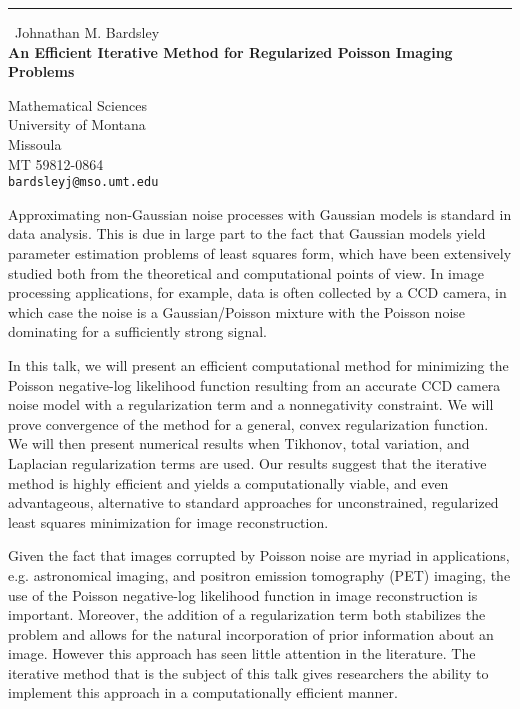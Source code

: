\documentclass{report}
\begin{document}
\begin{center}
\rule{6in}{1pt} \
{\large Johnathan M. Bardsley \\
{\bf An Efficient Iterative Method for Regularized Poisson Imaging Problems}}

Mathematical Sciences \\ University of Montana \\ Missoula \\ MT 59812-0864
\\
{\tt bardsleyj@mso.umt.edu}\end{center}

Approximating non-Gaussian noise processes with Gaussian models is
standard in data analysis. This is due in large part to the fact that
Gaussian models yield parameter estimation problems of least squares
form, which have been extensively studied both from the theoretical and
computational points of view. In image processing applications, for
example, data is often collected by a CCD camera, in which case the noise
is a Gaussian/Poisson mixture with the Poisson noise dominating for a
sufficiently strong signal.

In this talk, we will present an efficient computational method for
minimizing the Poisson negative-log likelihood function resulting from an
accurate CCD camera noise model with a regularization term and a
nonnegativity constraint. We will prove convergence of the method for a
general, convex regularization function. We will then present numerical
results when Tikhonov, total variation, and Laplacian regularization
terms are used. Our results suggest that the iterative method is highly
efficient and yields a computationally viable, and even advantageous,
alternative to standard approaches for unconstrained, regularized least
squares minimization for image reconstruction.

Given the fact that images corrupted by Poisson noise are myriad in
applications, e.g. astronomical imaging, and positron emission tomography
(PET) imaging, the use of the Poisson negative-log likelihood function in
image reconstruction is important. Moreover, the addition of a
regularization term both stabilizes the problem and allows for the
natural incorporation of prior information about an image. However this
approach has seen little attention in the literature. The iterative
method that is the subject of this talk gives researchers the ability to
implement this approach in a computationally efficient manner.
\end{document}
